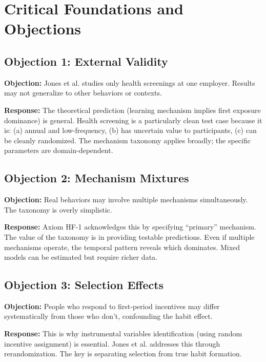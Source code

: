 \section{Critical Foundations and Objections}
\label{sec:hf-foundations}

\subsection{Objection 1: External Validity}

\textbf{Objection:} Jones et al. studies only health screenings at one employer.
Results may not generalize to other behaviors or contexts.

\textbf{Response:} The theoretical prediction (learning mechanism implies first exposure dominance)
is general. Health screening is a particularly clean test case because it is:
(a) annual and low-frequency, (b) has uncertain value to participants,
(c) can be cleanly randomized. The mechanism taxonomy applies broadly;
the specific parameters are domain-dependent.

\subsection{Objection 2: Mechanism Mixtures}

\textbf{Objection:} Real behaviors may involve multiple mechanisms simultaneously.
The taxonomy is overly simplistic.

\textbf{Response:} Axiom HF-1 acknowledges this by specifying ``primary'' mechanism.
The value of the taxonomy is in providing testable predictions. Even if multiple
mechanisms operate, the temporal pattern reveals which dominates. Mixed models
can be estimated but require richer data.

\subsection{Objection 3: Selection Effects}

\textbf{Objection:} People who respond to first-period incentives may differ
systematically from those who don't, confounding the habit effect.

\textbf{Response:} This is why instrumental variables identification (using random
incentive assignment) is essential. Jones et al. addresses this through
rerandomization. The key is separating selection from true habit formation.

